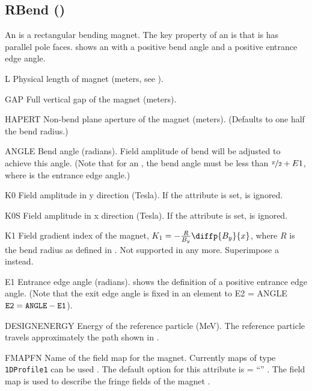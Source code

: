 

\subsection{RBend (\opalt)}
\label{ssec:RBend}
An  is a rectangular bending magnet. The key property of an  is that is has parallel
pole faces.  shows an  with a positive bend angle and a positive entrance edge angle.

\begin{kdescription}
\item[L]
  Physical length of magnet (meters, see ).

\item[GAP]
  Full vertical gap of the magnet (meters).

\item[HAPERT]
  Non-bend plane aperture of the magnet (meters). (Defaults to one half the bend radius.)

\item[ANGLE]
  Bend angle (radians). Field amplitude of bend will be adjusted to achieve this angle. (Note that for
  an , the bend angle must be less than $\nicefrac{\pi}{2} + E1$, where  is the entrance edge angle.)

\item[K0]
  Field amplitude in y direction (Tesla). If the  attribute is set,  is ignored.

\item[K0S]
  Field amplitude in x direction (Tesla). If the  attribute is set,  is ignored.

\item[K1]
  Field gradient index of the magnet, $K_1=-\frac{R}{B_{y}}\diffp{B_y}{x}$, where
  $R$ is the bend radius as defined in . Not supported in \noopalt any more. Superimpose a  instead.

\item[E1]
  Entrance edge angle (radians).  shows the definition of a positive entrance
  edge angle. (Note that the exit edge angle is fixed in an  element to E2 = ANGLE
  $\text{\keyword{E2}} = \text{\keyword{ANGLE}} - \text{\keyword{E1}}$).

\item[DESIGNENERGY]
  Energy of the reference particle (\si{\mega\electronvolt}). The reference particle travels approximately the path shown in
  .

\item[FMAPFN]
  Name of the field map for the magnet. Currently maps of type \texttt{1DProfile1} can
  be used . The default option for this attribute is  =
  ``'' . The field map is used to
  describe the fringe fields of the magnet .

\end{kdescription}

